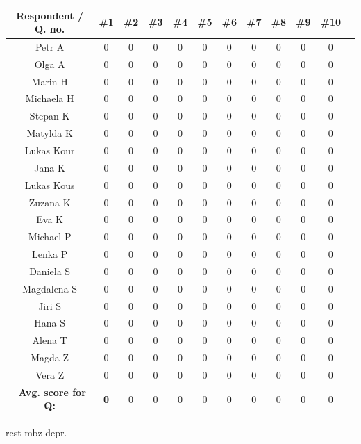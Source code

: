 \begin{tabular}{ |c|c|c|c|c|c|c|c|c|c|c|c| } 
    \hline
    Respondent / Q. no. & \#1 & \#2& \#3& \#4& \#5& \#6& \#7& \#8& \#9& \#10 \\
    \hline
    Petr A & 0 & 0& 0& 0& 0& 0& 0& 0& 0& 0 \\ 
    Olga A & 0 & 0& 0& 0& 0& 0& 0& 0& 0& 0 \\ 
    Marin H & 0 & 0& 0& 0& 0& 0& 0& 0& 0& 0 \\ 
    Michaela H & 0 & 0& 0& 0& 0& 0& 0& 0& 0& 0 \\ 
    Stepan K & 0 & 0& 0& 0& 0& 0& 0& 0& 0& 0 \\ 
    Matylda K & 0 & 0& 0& 0& 0& 0& 0& 0& 0& 0 \\ 
    Lukas Kour & 0 & 0& 0& 0& 0& 0& 0& 0& 0& 0 \\ 
    Jana K & 0 & 0& 0& 0& 0& 0& 0& 0& 0& 0 \\ 
    Lukas Kous & 0 & 0& 0& 0& 0& 0& 0& 0& 0& 0 \\ 
    Zuzana K & 0 & 0& 0& 0& 0& 0& 0& 0& 0& 0 \\ 
    Eva K & 0 & 0& 0& 0& 0& 0& 0& 0& 0& 0 \\ 
    Michael P & 0 & 0& 0& 0& 0& 0& 0& 0& 0& 0 \\ 
    Lenka P & 0 & 0& 0& 0& 0& 0& 0& 0& 0& 0 \\ 
    Daniela S & 0 & 0& 0& 0& 0& 0& 0& 0& 0& 0 \\ 
    Magdalena S & 0 & 0& 0& 0& 0& 0& 0& 0& 0& 0 \\ 
    Jiri S & 0 & 0& 0& 0& 0& 0& 0& 0& 0& 0 \\ 
    Hana S & 0 & 0& 0& 0& 0& 0& 0& 0& 0& 0 \\ 
    Alena T & 0 & 0& 0& 0& 0& 0& 0& 0& 0& 0 \\ 
    Magda Z & 0 & 0& 0& 0& 0& 0& 0& 0& 0& 0 \\ 
    Vera Z & 0 & 0& 0& 0& 0& 0& 0& 0& 0& 0 \\ \
    \textbf{Avg. score for Q:} & \textbf{0} & 0& 0& 0& 0& 0& 0& 0& 0& 0 \\ 
    \hline
\end{tabular}
\newpage
rest mbz depr.
